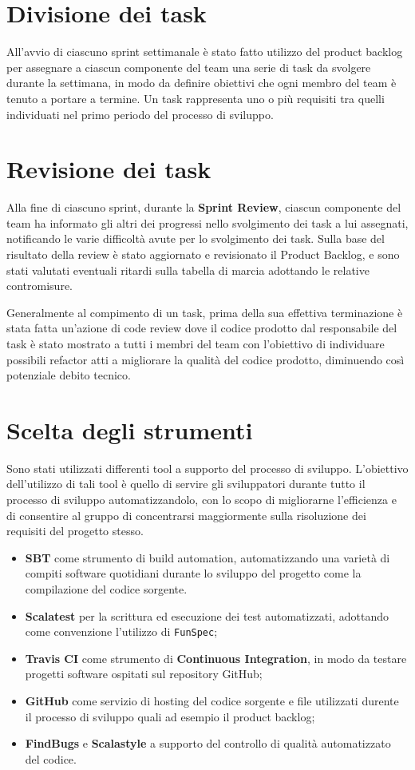 \section{Divisione dei task}
All'avvio di ciascuno sprint settimanale è stato fatto utilizzo del product backlog per assegnare a ciascun componente del team una serie di task da svolgere durante la settimana, in modo da definire obiettivi che ogni membro del team è tenuto a portare a termine. Un task rappresenta uno o più requisiti tra quelli individuati nel primo periodo del processo di sviluppo.

\section{Revisione dei task}
Alla fine di ciascuno sprint, durante la \textbf{Sprint Review}, ciascun componente del team ha informato gli altri dei progressi nello svolgimento dei task a lui assegnati, notificando le varie difficoltà avute per lo svolgimento dei task. Sulla base del risultato della review è stato aggiornato e revisionato il Product Backlog, e sono stati valutati eventuali ritardi sulla tabella di marcia adottando le relative contromisure.

Generalmente al compimento di un task, prima della sua effettiva terminazione è stata fatta un'azione di code review dove il codice prodotto dal responsabile del task è stato mostrato a tutti i membri del team con l'obiettivo di individuare possibili refactor atti a migliorare la qualità del codice prodotto, diminuendo così potenziale debito tecnico.

\section{Scelta degli strumenti}
Sono stati utilizzati differenti tool a supporto del processo di sviluppo. L'obiettivo dell'utilizzo di tali tool è quello di servire gli sviluppatori durante tutto il processo di sviluppo automatizzandolo, con lo scopo di migliorarne l'efficienza e di consentire al gruppo di concentrarsi maggiormente sulla risoluzione dei requisiti del progetto stesso.

\begin{itemize}
    \item \textbf{SBT} come strumento di build automation, automatizzando una varietà di compiti software quotidiani durante lo sviluppo del progetto come la compilazione del codice sorgente.
    \item \textbf{Scalatest} per la scrittura ed esecuzione dei test automatizzati, adottando come convenzione l'utilizzo di \texttt{FunSpec};
    \item \textbf{Travis CI} come strumento di \textbf{Continuous Integration}, in modo da testare progetti software ospitati sul repository GitHub;
    \item \textbf{GitHub} come servizio di hosting del codice sorgente e file utilizzati durente il processo di sviluppo quali ad esempio il product backlog;
    \item \textbf{FindBugs} e \textbf{Scalastyle} a supporto del controllo di qualità automatizzato del codice.
\end{itemize}